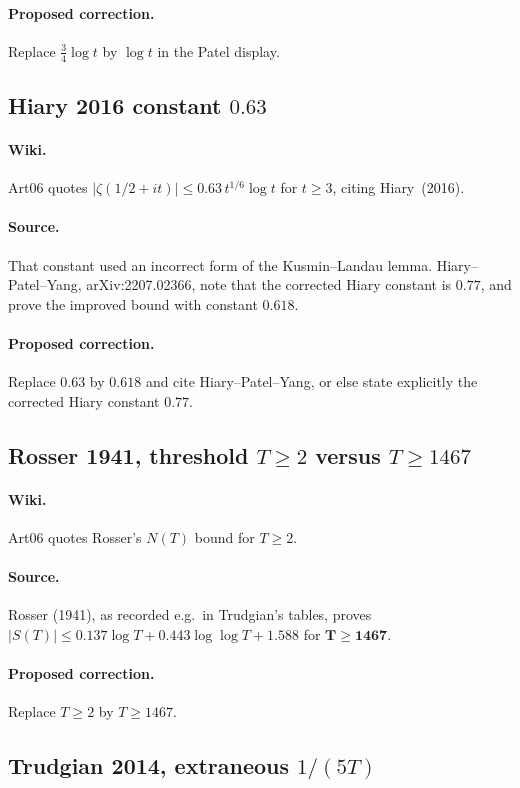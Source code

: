 \documentclass[11pt,a4paper]{article}
\begin{document}
\paragraph{Proposed correction.}
Replace $\tfrac34\log t$ by $\log t$ in the Patel display.

\subsection{Hiary 2016 constant $0.63$}
\label{err:hiary-063}
\paragraph{Wiki.}
Art06 quotes $|\zeta(1/2+it)|\le 0.63\,t^{1/6}\log t$ for $t\ge 3$,
citing Hiary~(2016).
\paragraph{Source.}
That constant used an incorrect form of the Kusmin--Landau lemma.
Hiary--Patel--Yang, arXiv:2207.02366, note that the corrected Hiary
constant is $0.77$, and prove the improved bound with constant
$\mathbf{0.618}$.
\paragraph{Proposed correction.}
Replace $0.63$ by $0.618$ and cite Hiary--Patel--Yang, or else state
explicitly the corrected Hiary constant $0.77$.

\subsection{Rosser 1941, threshold $T\ge 2$ versus $T\ge 1467$}
\label{err:rosser-threshold}
\paragraph{Wiki.}
Art06 quotes Rosser's $N(T)$ bound for $T\ge 2$.
\paragraph{Source.}
Rosser (1941), as recorded e.g.\ in Trudgian's tables, proves
$|S(T)|\le 0.137\log T+0.443\log\log T+1.588$ for
$\mathbf{T\ge 1467}$.
\paragraph{Proposed correction.}
Replace $T\ge 2$ by $T\ge 1467$.

\subsection{Trudgian 2014, extraneous $1/(5T)$}
\label{err:trudgian-N-5T}
\end{document}
